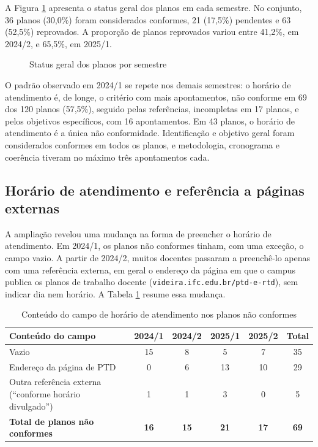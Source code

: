A Figura \ref{fig:semestres} apresenta o status geral dos planos em cada semestre. No conjunto, 36 planos (30,0\%) foram considerados conformes, 21 (17,5\%) pendentes e 63 (52,5\%) reprovados. A proporção de planos reprovados variou entre 41,2\%, em 2024/2, e 65,5\%, em 2025/1.

\begin{figure}[htbp]
\centering
\caption{Status geral dos planos por semestre}
\label{fig:semestres}

\end{figure}

O padrão observado em 2024/1 se repete nos demais semestres: o horário de atendimento é, de longe, o critério com mais apontamentos, não conforme em 69 dos 120 planos (57,5\%), seguido pelas referências, incompletas em 17 planos, e pelos objetivos específicos, com 16 apontamentos. Em 43 planos, o horário de atendimento é a única não conformidade. Identificação e objetivo geral foram considerados conformes em todos os planos, e metodologia, cronograma e coerência tiveram no máximo três apontamentos cada.

\subsection{Horário de atendimento e referência a páginas externas}

A ampliação revelou uma mudança na forma de preencher o horário de atendimento. Em 2024/1, os planos não conformes tinham, com uma exceção, o campo vazio. A partir de 2024/2, muitos docentes passaram a preenchê-lo apenas com uma referência externa, em geral o endereço da página em que o campus publica os planos de trabalho docente (\texttt{videira.ifc.edu.br/ptd-e-rtd}), sem indicar dia nem horário. A Tabela \ref{tab:horario-semestres} resume essa mudança.

\begin{table}[H]
\centering
\caption{Conteúdo do campo de horário de atendimento nos planos não conformes}
\label{tab:horario-semestres}
\footnotesize
\begin{tabular}{@{}lccccc@{}}
\toprule
\rowcolor[HTML]{EFEFEF}
\textbf{Conteúdo do campo} & \textbf{2024/1} & \textbf{2024/2} & \textbf{2025/1} & \textbf{2025/2} & \textbf{Total} \\ \midrule
Vazio & 15 & 8 & 5 & 7 & 35 \\
Endereço da página de PTD & 0 & 6 & 13 & 10 & 29 \\
Outra referência externa (``conforme horário divulgado'') & 1 & 1 & 3 & 0 & 5 \\ \midrule
\textbf{Total de planos não conformes} & \textbf{16} & \textbf{15} & \textbf{21} & \textbf{17} & \textbf{69} \\ \bottomrule
\end{tabular}
\end{table}

